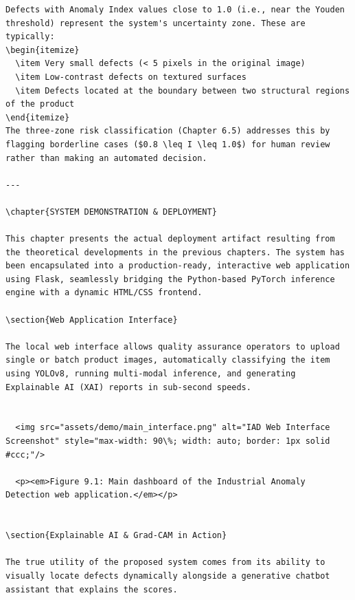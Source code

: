 \documentclass[12pt,a4paper,oneside]{report}
\begin{document}
\begin{verbatim}
Defects with Anomaly Index values close to 1.0 (i.e., near the Youden threshold) represent the system's uncertainty zone. These are typically:
\begin{itemize}
  \item Very small defects (< 5 pixels in the original image)
  \item Low-contrast defects on textured surfaces
  \item Defects located at the boundary between two structural regions of the product
\end{itemize}
The three-zone risk classification (Chapter 6.5) addresses this by flagging borderline cases ($0.8 \leq I \leq 1.0$) for human review rather than making an automated decision.

---

\chapter{SYSTEM DEMONSTRATION & DEPLOYMENT}

This chapter presents the actual deployment artifact resulting from the theoretical developments in the previous chapters. The system has been encapsulated into a production-ready, interactive web application using Flask, seamlessly bridging the Python-based PyTorch inference engine with a dynamic HTML/CSS frontend.

\section{Web Application Interface}

The local web interface allows quality assurance operators to upload single or batch product images, automatically classifying the item using YOLOv8, running multi-modal inference, and generating Explainable AI (XAI) reports in sub-second speeds.


  <img src="assets/demo/main_interface.png" alt="IAD Web Interface Screenshot" style="max-width: 90\%; width: auto; border: 1px solid #ccc;"/>
  
  <p><em>Figure 9.1: Main dashboard of the Industrial Anomaly Detection web application.</em></p>


\section{Explainable AI & Grad-CAM in Action}

The true utility of the proposed system comes from its ability to visually locate defects dynamically alongside a generative chatbot assistant that explains the scores.



\end{verbatim}
\end{document}
